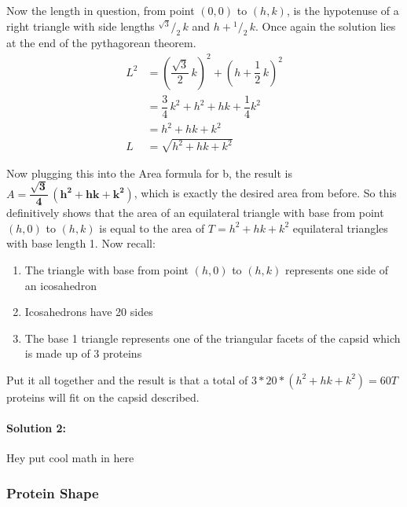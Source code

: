 \documentclass[12pt,letter]{article}
\newcommand*\rfrac[2]{{}^{#1}\!/_{#2}}
\begin{document}
Now the length in question, from point $(0,0)$ to $(h,k)$, is the hypotenuse of a right triangle with side lengths $\rfrac{\sqrt{3}} {2} \, k$ and $h+\rfrac 1 2 \, k$. Once again the solution lies at the end of the pythagorean theorem.
\begin{align*}
L^2 &= \left(\dfrac{\sqrt{3}} {2} \, k\right)^2 + \left(h+\dfrac 1 2 \, k\right)^2 \\
&= \dfrac 3 4 \, k^2 + h^2 + hk + \dfrac 1 4 k^2 \\
& = h^2 + hk + k^2 \\
L & = \sqrt{h^2 + hk + k^2}
\end{align*}

Now plugging this into the Area formula for b, the result is $A = \mathbf{ \dfrac{\sqrt{3}} {4} \, (h^2 + hk + k^2) }$, which is exactly the desired area from before. So this definitively shows that the area of an equilateral triangle with base from point $(h,0)$ to $(h,k)$ is equal to the area of $T = h^2 + hk + k^2$ equilateral triangles with base length 1. Now recall:

\begin{enumerate}
	\item The triangle with base from point $(h,0)$ to $(h,k)$ represents one side of an icosahedron
	\item Icosahedrons have 20 sides
	\item The base 1 triangle represents one of the triangular facets of the capsid which is made up of 3 proteins
\end{enumerate}

Put it all together and the result is that a total of $3*20*(h^2 + hk + k^2) = 60 T$ proteins will fit on the capsid described.

\paragraph{Solution 2:}

Hey put cool math in here

\subsubsection{Protein Shape}
\end{document}
